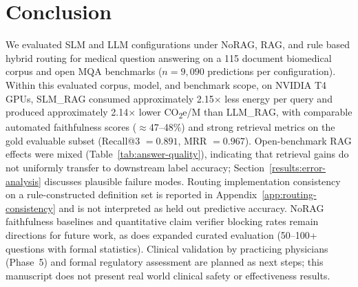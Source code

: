 \section{Conclusion}
\label{conclusion}
We evaluated SLM and LLM configurations under NoRAG, RAG, and rule based hybrid routing for medical question answering on a 115 document biomedical corpus and open MQA benchmarks ($n{=}9{,}090$ predictions per configuration). Within this evaluated corpus, model, and benchmark scope, on NVIDIA T4 GPUs, SLM\_RAG consumed approximately 2.15$\times$ less energy per query and produced approximately 2.14$\times$ lower CO\textsubscript{2}e/M than LLM\_RAG, with comparable automated faithfulness scores ($\approx$47--48\%) and strong retrieval metrics on the gold evaluable subset (Recall@3 $=0.891$, MRR $=0.967$). Open-benchmark RAG effects were mixed (Table~\ref{tab:answer-quality}), indicating that retrieval gains do not uniformly transfer to downstream label accuracy; Section~\ref{results:error-analysis} discusses plausible failure modes. Routing implementation consistency on a rule-constructed definition set is reported in Appendix~\ref{app:routing-consistency} and is not interpreted as held out predictive accuracy. NoRAG faithfulness baselines and quantitative claim verifier blocking rates remain directions for future work, as does expanded curated evaluation (50--100+ questions with formal statistics). Clinical validation by practicing physicians (Phase~5) and formal regulatory assessment are planned as next steps; this manuscript does not present real world clinical safety or effectiveness results.
